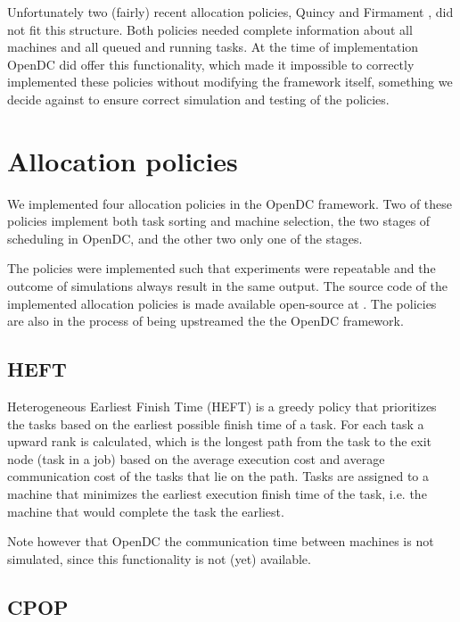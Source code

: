 \documentclass[twocolumn,a4]{scrartcl}
\begin{document}
Unfortunately two (fairly) recent allocation policies, Quincy \cite{DBLP:conf/sosp/IsardPCWTG09} and Firmament \cite{DBLP:conf/osdi/GogSGWH16}, did not fit this structure. Both policies needed complete information about all machines and all queued and running tasks. At the time of implementation OpenDC did offer this functionality, which made it impossible to correctly implemented these policies without modifying the framework itself, something we decide against to ensure correct simulation and testing of the policies.



\section{Allocation policies} \label{sec_implementation}

We implemented four allocation policies in the OpenDC framework. Two of these policies implement both task sorting and machine selection, the two stages of scheduling in OpenDC, and the other two only one of the stages.

The policies were implemented such that experiments were repeatable and the outcome of simulations always result in the same output. The source code of the implemented allocation policies is made available open-source at \cite{DS:policies-opensource}. The policies are also in the process of being upstreamed the the OpenDC framework.


\subsection{HEFT} \label{sec_heft}

Heterogeneous Earliest Finish Time (HEFT) is a greedy policy that prioritizes the tasks based on the earliest possible finish time of a task. For each task a upward rank is calculated, which is the longest path from the task to the exit node (task in a job) based on the average execution cost and average communication cost of the tasks that lie on the path. Tasks are assigned to a machine that minimizes the earliest execution finish time of the task, i.e. the machine that would complete the task the earliest. \cite{DBLP:journals/tpds/TopcuogluHW02}

Note however that OpenDC the communication time between machines is not simulated, since this functionality is not (yet) available.

\subsection{CPOP} \label{sec_cpop}
\end{document}
